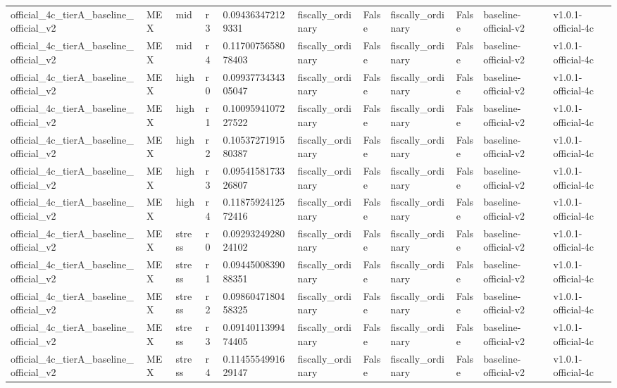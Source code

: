 \begin{landscape}
\begin{longtable}{lllllllllll}
official\_4c\_tierA\_baseline\_official\_v2 & MEX & mid & r3 & 0.094363472129331 & fiscally\_ordinary & False & fiscally\_ordinary & False & baseline-official-v2 & v1.0.1-official-4c \\
official\_4c\_tierA\_baseline\_official\_v2 & MEX & mid & r4 & 0.1170075658078403 & fiscally\_ordinary & False & fiscally\_ordinary & False & baseline-official-v2 & v1.0.1-official-4c \\
official\_4c\_tierA\_baseline\_official\_v2 & MEX & high & r0 & 0.0993773434305047 & fiscally\_ordinary & False & fiscally\_ordinary & False & baseline-official-v2 & v1.0.1-official-4c \\
official\_4c\_tierA\_baseline\_official\_v2 & MEX & high & r1 & 0.1009594107227522 & fiscally\_ordinary & False & fiscally\_ordinary & False & baseline-official-v2 & v1.0.1-official-4c \\
official\_4c\_tierA\_baseline\_official\_v2 & MEX & high & r2 & 0.1053727191580387 & fiscally\_ordinary & False & fiscally\_ordinary & False & baseline-official-v2 & v1.0.1-official-4c \\
official\_4c\_tierA\_baseline\_official\_v2 & MEX & high & r3 & 0.0954158173326807 & fiscally\_ordinary & False & fiscally\_ordinary & False & baseline-official-v2 & v1.0.1-official-4c \\
official\_4c\_tierA\_baseline\_official\_v2 & MEX & high & r4 & 0.1187592412572416 & fiscally\_ordinary & False & fiscally\_ordinary & False & baseline-official-v2 & v1.0.1-official-4c \\
official\_4c\_tierA\_baseline\_official\_v2 & MEX & stress & r0 & 0.0929324928024102 & fiscally\_ordinary & False & fiscally\_ordinary & False & baseline-official-v2 & v1.0.1-official-4c \\
official\_4c\_tierA\_baseline\_official\_v2 & MEX & stress & r1 & 0.0944500839088351 & fiscally\_ordinary & False & fiscally\_ordinary & False & baseline-official-v2 & v1.0.1-official-4c \\
official\_4c\_tierA\_baseline\_official\_v2 & MEX & stress & r2 & 0.0986047180458325 & fiscally\_ordinary & False & fiscally\_ordinary & False & baseline-official-v2 & v1.0.1-official-4c \\
official\_4c\_tierA\_baseline\_official\_v2 & MEX & stress & r3 & 0.0914011399474405 & fiscally\_ordinary & False & fiscally\_ordinary & False & baseline-official-v2 & v1.0.1-official-4c \\
official\_4c\_tierA\_baseline\_official\_v2 & MEX & stress & r4 & 0.1145554991629147 & fiscally\_ordinary & False & fiscally\_ordinary & False & baseline-official-v2 & v1.0.1-official-4c \\
\bottomrule
\end{longtable}
\end{landscape}
